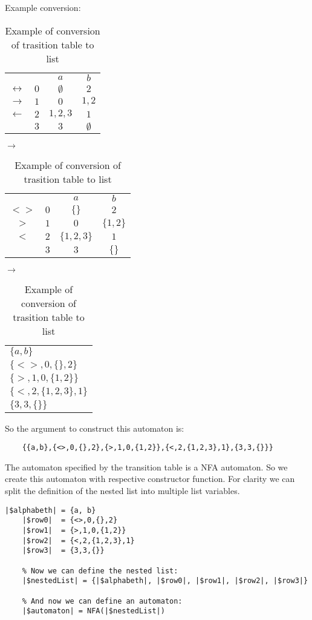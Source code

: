 \documentclass{ctuthesis}
\begin{document}
Example conversion:
\begin{table}[H]
\begin{ctucolortab}
\begin{tabular}{cc|cc}
	&	& $a$	& $b$ \\\Midrule
$\leftrightarrow$	& $0$	& $\emptyset$	& $2$ \\
$\rightarrow$	& $1$ & $0$ & $1,2$ \\
$\leftarrow$	& $2$ & $1,2,3$ & $1$ \\
				& $3$ & $3$	& $\emptyset$ 
\end{tabular}
\quad
$\rightarrow$
\begin{tabular}{|c|c|c|c|}
\hline
	&&$a$&$b$ \\
	$<>$ & $0$ & $\{\}$ & $2$ \\
	$>$ & $1$ & $0$ & $\{1,2\}$ \\
	$<$ & $2$ & $\{1,2,3\}$ & $1$ \\
		& $3$ & $3$ & $\{\}$\\
		\hline
\end{tabular}
\quad 
$\rightarrow$
\begin{tabular}{|l|}
\hline 
$\{a, b\}$ \\
$\{<>,0,\{\}, 2\}$ \\
$\{>,1,0,\{1,2\}\}$ \\
$\{<,2,\{1,2,3\},1\}$ \\
$\{3, 3, \{\}\}$ \\\hline
\end{tabular}
\end{ctucolortab}
\caption{Example of conversion of trasition table to list}
\label{fig:example_conversion}
\end{table}

So the argument to construct this automaton is:
\begin{verbatim}
	{{a,b},{<>,0,{},2},{>,1,0,{1,2}},{<,2,{1,2,3},1},{3,3,{}}}
\end{verbatim}

The automaton specified by the transition table is a NFA automaton. So we create this automaton with respective constructor function. For clarity we can split the definition of the nested list into multiple list variables. 

\begin{minipage}{\linewidth}
\begin{lstlisting}[language = JASL]
	|$alphabeth| = {a, b}
	|$row0|  = {<>,0,{},2}
	|$row1|  = {>,1,0,{1,2}}
	|$row2|  = {<,2,{1,2,3},1}
	|$row3|  = {3,3,{}}
	
	% Now we can define the nested list:
	|$nestedList| = {|$alphabeth|, |$row0|, |$row1|, |$row2|, |$row3|}
    
	% And now we can define an automaton:
	|$automaton| = NFA(|$nestedList|)
\end{lstlisting}
\end{minipage}
\end{document}

